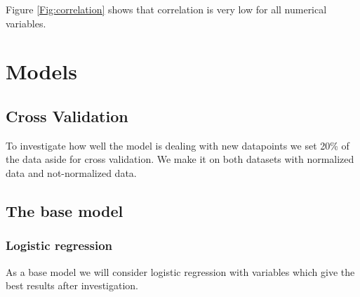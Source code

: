 \documentclass[
]{report}
\newenvironment{Shaded}{\begin{snugshade}}{\end{snugshade}}
\newcommand{\AttributeTok}[1]{\textcolor[rgb]{0.77,0.63,0.00}{#1}}
\newcommand{\DecValTok}[1]{\textcolor[rgb]{0.00,0.00,0.81}{#1}}
\newcommand{\FloatTok}[1]{\textcolor[rgb]{0.00,0.00,0.81}{#1}}
\newcommand{\FunctionTok}[1]{\textcolor[rgb]{0.00,0.00,0.00}{#1}}
\newcommand{\NormalTok}[1]{#1}
\newcommand{\OtherTok}[1]{\textcolor[rgb]{0.56,0.35,0.01}{#1}}
\newcommand{\SpecialCharTok}[1]{\textcolor[rgb]{0.00,0.00,0.00}{#1}}
\begin{document}
Figure \ref{Fig:correlation} shows that correlation is very low for all
numerical variables.

\hypertarget{models}{%
\chapter{Models}\label{models}}

\hypertarget{cross-validation}{%
\section{Cross Validation}\label{cross-validation}}

To investigate how well the model is dealing with new datapoints we set
20\% of the data aside for cross validation. We make it on both datasets
with normalized data and not-normalized data.

\begin{Shaded}
\end{Shaded}

\hypertarget{the-base-model}{%
\section{The base model}\label{the-base-model}}

\hypertarget{logistic-regression}{%
\subsection{Logistic regression}\label{logistic-regression}}

As a base model we will consider logistic regression with variables
which give the best results after investigation.
\end{document}
